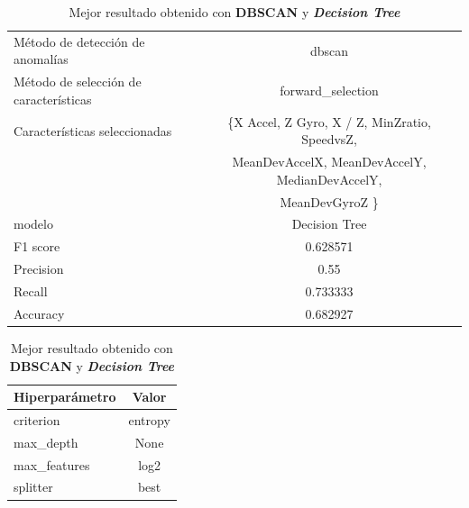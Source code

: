 \begin{appendices}
		\begin{table}[htb]
			\centering
			\caption{Mejor resultado obtenido con \textbf{DBSCAN} y \textbf{\emph{Decision Tree}}}
			\label{table:23}
			\begin{tabular}{lc}
				\toprule
					  Método de detección de anomalías &                                             dbscan \\
				Método de selección de características &                                  forward\_selection \\
						 Características seleccionadas & \{X Accel, Z Gyro, X / Z, MinZratio, SpeedvsZ, \\
						 							   &   MeanDevAccelX, MeanDevAccelY, MedianDevAccelY, \\
													   &                                    MeanDevGyroZ \} \\
												modelo &                                      Decision Tree \\
											  F1 score &                                           0.628571 \\
											 Precision &                                               0.55 \\
												Recall &                                           0.733333 \\
											  Accuracy &                                           0.682927 \\
				\bottomrule
			\end{tabular}
			\newline
			\newline

			\begin{tabular}{lc}
				\toprule
				Hiperparámetro &   Valor \\
				\midrule
					 criterion & entropy \\
					 max\_depth &    None \\
				  max\_features &    log2 \\
					  splitter &    best \\
				\bottomrule
			\end{tabular}
			
		\end{table}


\end{appendices}

